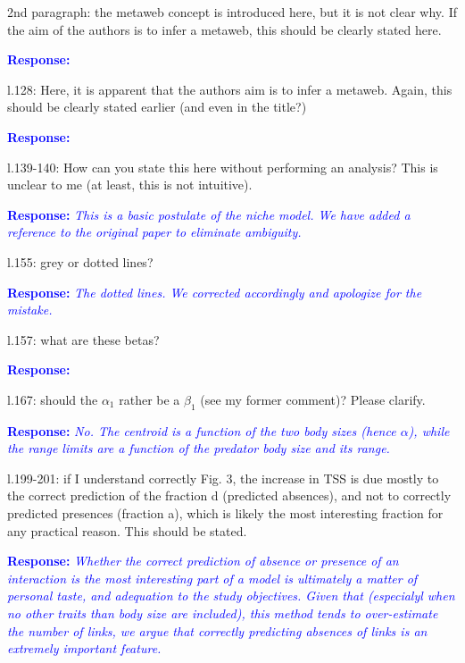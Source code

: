 \documentclass [12pt,onecolumn,twoside,openright]{report}
\begin{document}
\begin{onehalfspacing}
\medskip 2nd paragraph: the metaweb concept is introduced
here, but it is not clear why. If the aim of the authors is to infer a metaweb,
this should be clearly stated here.

\textcolor{blue}{\textbf{Response:}} \textit{\textcolor{blue}{}}

\medskip l.128: Here, it is apparent that the authors aim is
to infer a metaweb. Again, this should be clearly stated earlier (and even in
the title?)

\textcolor{blue}{\textbf{Response:}} \textit{\textcolor{blue}{}}

\medskip l.139-140: How can you state this here without
performing an analysis? This is unclear to me (at least, this is not intuitive).


\textcolor{blue}{\textbf{Response:}} \textit{\textcolor{blue}{This is a basic
postulate of the niche model. We have added a reference to the original paper to
eliminate ambiguity.}}

\medskip l.155: grey or dotted lines?

\textcolor{blue}{\textbf{Response:}} \textit{\textcolor{blue}{The
  \emph{dotted} lines. We corrected accordingly and apologize for the mistake.}}

\medskip l.157: what are these betas?

\textcolor{blue}{\textbf{Response:}} \textit{\textcolor{blue}{}}

\medskip l.167: should the $\alpha_1$ rather be a $\beta_1$
(see my former comment)? Please clarify.


\textcolor{blue}{\textbf{Response:}} \textit{\textcolor{blue}{No. The centroid
is a function of the two body sizes (hence $\alpha$), while the range limits are
a function of the predator body size and its range.}}

\medskip l.199-201: if I understand correctly Fig. 3, the
increase in TSS is due mostly to the correct prediction of the fraction d
(predicted absences), and not to correctly predicted presences (fraction a),
which is likely the most interesting fraction for any practical reason. This
should be stated.

\textcolor{blue}{\textbf{Response:}} \textit{\textcolor{blue}{Whether the
correct prediction of absence or presence of an interaction is the most
interesting part of a model is ultimately a matter of personal taste, and
adequation to the study objectives. Given that (especialyl when no other traits
than body size are included), this method tends to over-estimate the number of
links, we argue that correctly predicting absences of links is an extremely
important feature.}}


\end{onehalfspacing}
\end{document}
